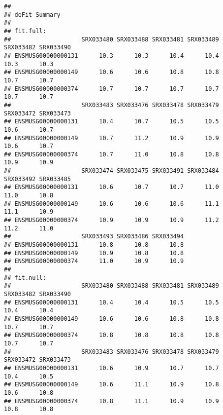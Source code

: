 \documentclass[]{article}
\newenvironment{Shaded}{\begin{snugshade}}{\end{snugshade}}
\newcommand{\KeywordTok}[1]{\textcolor[rgb]{0.13,0.29,0.53}{\textbf{#1}}}
\newcommand{\DataTypeTok}[1]{\textcolor[rgb]{0.13,0.29,0.53}{#1}}
\newcommand{\StringTok}[1]{\textcolor[rgb]{0.31,0.60,0.02}{#1}}
\newcommand{\OperatorTok}[1]{\textcolor[rgb]{0.81,0.36,0.00}{\textbf{#1}}}
\newcommand{\NormalTok}[1]{#1}
\begin{document}
\begin{Shaded}
\end{Shaded}

\begin{verbatim}
## 
## deFit Summary 
##  
## fit.full: 
##                    SRX033480 SRX033488 SRX033481 SRX033489 SRX033482 SRX033490
## ENSMUSG00000000131      10.3      10.3      10.4      10.4      10.3      10.3
## ENSMUSG00000000149      10.6      10.6      10.8      10.8      10.7      10.7
## ENSMUSG00000000374      10.7      10.7      10.7      10.7      10.7      10.7
##                    SRX033483 SRX033476 SRX033478 SRX033479 SRX033472 SRX033473
## ENSMUSG00000000131      10.4      10.7      10.5      10.5      10.6      10.7
## ENSMUSG00000000149      10.7      11.2      10.9      10.9      10.6      10.7
## ENSMUSG00000000374      10.7      11.0      10.8      10.8      10.9      10.9
##                    SRX033474 SRX033475 SRX033491 SRX033484 SRX033492 SRX033485
## ENSMUSG00000000131      10.6      10.7      10.7      11.0      11.0      10.8
## ENSMUSG00000000149      10.6      10.6      10.6      11.1      11.1      10.9
## ENSMUSG00000000374      10.9      10.9      10.9      11.2      11.2      11.0
##                    SRX033493 SRX033486 SRX033494
## ENSMUSG00000000131      10.8      10.8      10.8
## ENSMUSG00000000149      10.9      10.8      10.8
## ENSMUSG00000000374      11.0      10.9      10.9
## 
## fit.null: 
##                    SRX033480 SRX033488 SRX033481 SRX033489 SRX033482 SRX033490
## ENSMUSG00000000131      10.4      10.4      10.5      10.5      10.4      10.4
## ENSMUSG00000000149      10.6      10.6      10.8      10.8      10.7      10.7
## ENSMUSG00000000374      10.8      10.8      10.8      10.8      10.7      10.7
##                    SRX033483 SRX033476 SRX033478 SRX033479 SRX033472 SRX033473
## ENSMUSG00000000131      10.6      10.9      10.7      10.7      10.4      10.5
## ENSMUSG00000000149      10.6      11.1      10.9      10.8      10.6      10.8
## ENSMUSG00000000374      10.8      11.1      10.9      10.9      10.8      10.8

\end{verbatim}
\end{document}
